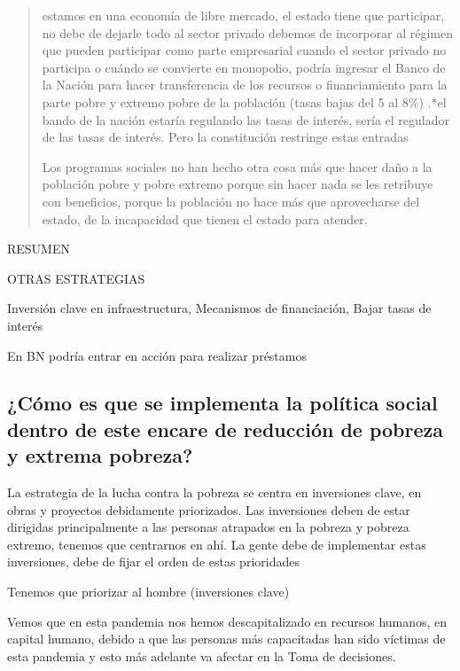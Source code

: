 \documentclass[
  a4paper,
]{article}
\begin{document}
\begin{quote}
estamos en una economía de libre mercado, el estado tiene que
participar, no debe de dejarle todo al sector privado debemos de
incorporar al régimen que pueden participar como parte empresarial
cuando el sector privado no participa o cuándo se convierte en
monopolio, podría ingresar el Banco de la Nación para hacer
transferencia de los recursos o financiamiento para la parte pobre y
extremo pobre de la población (tasas bajas del 5 al 8\%) .*el bando de
la nación estaría regulando las tasas de interés, sería el regulador de
las tasas de interés. Pero la constitución restringe estas entradas

Los programas sociales no han hecho otra cosa más que hacer daño a la
población pobre y pobre extremo porque sin hacer nada se les retribuye
con beneficios, porque la población no hace más que aprovecharse del
estado, de la incapacidad que tienen el estado para atender.
\end{quote}

RESUMEN

OTRAS ESTRATEGIAS

Inversión clave en infraestructura, Mecanismos de financiación, Bajar
tasas de interés

En BN podría entrar en acción para realizar préstamos

\hypertarget{cuxf3mo-es-que-se-implementa-la-poluxedtica-social-dentro-de-este-encare-de-reducciuxf3n-de-pobreza-y-extrema-pobreza}{%
\subsection{¿Cómo es que se implementa la política social dentro de este
encare de reducción de pobreza y extrema
pobreza?}\label{cuxf3mo-es-que-se-implementa-la-poluxedtica-social-dentro-de-este-encare-de-reducciuxf3n-de-pobreza-y-extrema-pobreza}}

La estrategia de la lucha contra la pobreza se centra en inversiones
clave, en obras y proyectos debidamente priorizados. Las inversiones
deben de estar dirigidas principalmente a las personas atrapados en la
pobreza y pobreza extremo, tenemos que centrarnos en ahí. La gente debe
de implementar estas inversiones, debe de fijar el orden de estas
prioridades

Tenemos que priorizar al hombre (inversiones clave)

Vemos que en esta pandemia nos hemos descapitalizado en recursos
humanos, en capital humano, debido a que las personas más capacitadas
han sido víctimas de esta pandemia y esto más adelante va afectar en la
Toma de decisiones.
\end{document}
